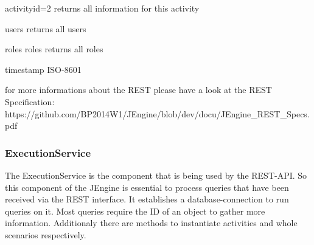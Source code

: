activityid=2
returns all information for this activity

users
returns all users

roles
roles returns all roles


timestamp ISO-8601
\fi

for more informations about the REST please have a look at the REST Specification:
https://github.com/BP2014W1/JEngine/blob/dev/docu/JEngine_REST_Specs.pdf


%
%
\subsubsection{ExecutionService}
The ExecutionService is the component that is being used by the REST-API. So this component of the JEngine is essential to process queries that have been received via the REST interface. It establishes a database-connection to run queries on it. Most queries require the ID of an object to gather more information. Additionaly there are methods to instantiate activities and whole scenarios respectively.